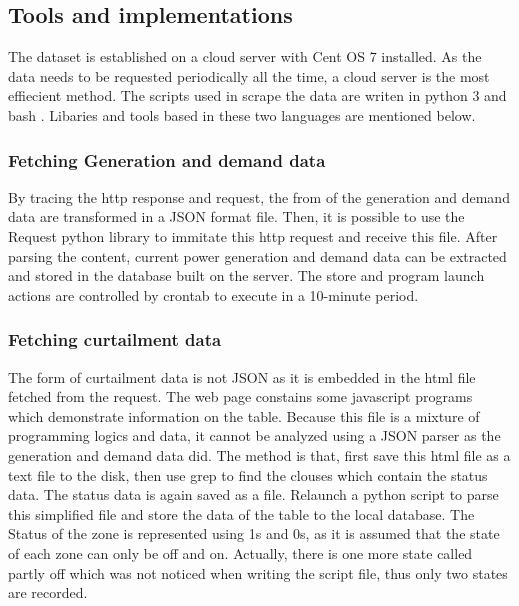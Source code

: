 \documentclass[12pt,a4paper]{report}
\begin{document}
        \subsection{Tools and implementations}
        The dataset is established on a cloud server with Cent OS 7 installed. As the data needs to be requested periodically all the time, a cloud server is the most
        effiecient method. The scripts used in scrape the data are writen in python 3 \cite{website:python3} and bash \cite{website:bash}. Libaries and tools based in these two languages are mentioned below.

                \subsubsection{Fetching Generation and demand data}
                By tracing the http response and request, the from of the generation and demand data are transformed in a JSON format file. Then, it is possible to 
                use the Request python library \cite{website:requestpython} to immitate this http request and receive this file. After parsing the content, current power generation and demand data can
                be extracted and stored in the database built on the server. The store and program launch actions are controlled by crontab \cite{website:crontab} to execute in a 10-minute period.

                \subsubsection{Fetching curtailment data}
                \label{text_fetching_curtailment_data}
                The form of curtailment data is not JSON as it is embedded in the html file fetched from the request. The web page constains some javascript programs which demonstrate information
                on the table. Because this file is a mixture of programming logics and data, it cannot be analyzed using a JSON parser as the generation and demand data did. The method is that, first
                save this html file as a text file to the disk, then use grep \cite{website:grep} to find the clouses which contain the status data. The status data is again saved as a file. Relaunch
                a python script to parse this simplified file and store the data of the table to the local database. The Status of the zone is represented using 1s and 0s, as it is assumed that the state
                of each zone can only be off and on. Actually, there is one more state called partly off which was not noticed when writing the script file, thus only two states are recorded.
\end{document}
